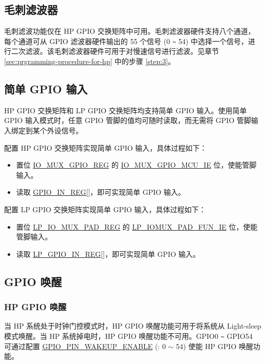\documentclass[main\_\_CN.tex]{subfiles}
\begin{document}
\subsection{毛刺滤波器}
\label{IOMUXGlitchFilter}
毛刺滤波功能仅在 HP GPIO 交换矩阵中可用。毛刺滤波器硬件支持八个通道，每个通道可从 GPIO 滤波器硬件输出的 55 个信号 (0 \verb+~+ 54) 中选择一个信号，进行二次滤波。该毛刺滤波器硬件可用于对慢速信号进行滤波。见章节 \ref{sec:prgramming-procedure-for-hp} 中的步骤  \ref{step:3}。

\subsection{简单 GPIO 输入}
\label{IOMUXSimpleGPIOInput}
HP GPIO 交换矩阵和 LP GPIO 交换矩阵均支持简单 GPIO 输入。使用简单 GPIO 输入模式时，任意 GPIO 管脚的值均可随时读取，而无需将 GPIO 管脚输入绑定到某个外设信号。

配置 HP GPIO 交换矩阵实现简单 GPIO 输入，具体过程如下：
\begin{itemize}
    \item 置位 \hyperref[regdesc:IOMUXGPIONREG]{IO\_MUX\_GPIO\_REG} 的 \hyperref[fielddesc:IOMUXGPIONMCUIE] {IO\_MUX\_GPIO\_MCU\_IE} 位，使能管脚输入。
    \item 读取 \hyperref[regdesc:GPIOINREG]{GPIO\_IN\_REG[]}，即可实现简单 GPIO 输入。
\end{itemize}

配置 LP GPIO 交换矩阵实现简单 GPIO 输入，具体过程如下：
\begin{itemize}
    \item 置位  \hyperref[regdesc:LPIOMUXPADNREG]{LP\_IO\_MUX\_PAD\_REG} 的  \hyperref[fielddesc:LPIOMUXPADNFUNIE] {LP\_IOMUX\_PAD\_FUN\_IE} 位，使能管脚输入。
    \item 读取 \hyperref[regdesc:LPGPIOINREG]{LP\_GPIO\_IN\_REG[]}，即可实现简单 GPIO 输入。
\end{itemize}


\subsection{GPIO 唤醒}
\label{IOMUXGPIOWakeup}
\subsubsection{HP GPIO 唤醒}
    当 HP 系统处于时钟门控模式时，HP GPIO 唤醒功能可用于将系统从 Light-sleep 模式唤醒。当 HP 系统掉电时，HP GPIO 唤醒功能不可用。GPIO0 \verb+~+ GPIO54 可通过配置 \hyperref[fielddesc:GPIOPINNWAKEUPENABLE] {GPIO\_PIN\_WAKEUP\_ENABLE} (: 0 $\sim$ 54) 使能 HP GPIO 唤醒功能。
\end{document}
